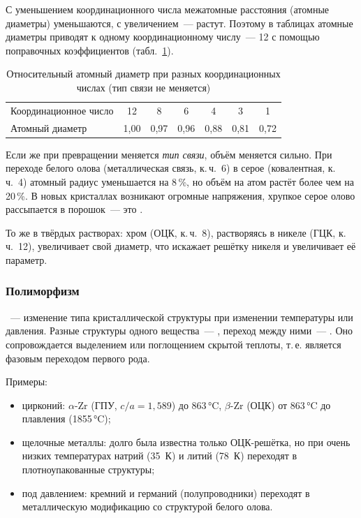 \begin{glavnoe}
С уменьшением координационного числа межатомные расстояния (атомные
диаметры) уменьшаются, с увеличением~— растут. Поэтому в таблицах
атомные диаметры приводят к одному координационному числу~— 12 с помощью
поправочных коэффициентов (табл.~\ref{tab:goldschmidt}).
\end{glavnoe}

\begin{table}[ht]
\centering
\caption{Относительный атомный диаметр при разных координационных числах
(тип связи не меняется)}
\label{tab:goldschmidt}
\small
\begin{tabular}{@{}lcccccc@{}}
\toprule
Координационное число & 12 & 8 & 6 & 4 & 3 & 1 \\
Атомный диаметр & 1,00 & 0,97 & 0,96 & 0,88 & 0,81 & 0,72 \\
\bottomrule
\end{tabular}
\end{table}

Если же при превращении меняется \emph{тип связи}, объём меняется сильно.
При переходе белого олова (металлическая связь, к.\,ч.~6) в серое
(ковалентная, к.\,ч.~4) атомный радиус уменьшается на 8\,\%, но объём на
атом растёт более чем на 20\,\%. В новых кристаллах возникают огромные
напряжения, хрупкое серое олово рассыпается в порошок~— это
.

То же в твёрдых растворах: хром (ОЦК, к.\,ч.~8), растворяясь в никеле (ГЦК,
к.\,ч.~12), увеличивает свой диаметр, что искажает решётку никеля и
увеличивает её параметр.

\subsubsection{Полиморфизм}

\begin{opredelenie}
~— изменение типа кристаллической структуры при
изменении температуры или давления. Разные структуры одного вещества~—
, переход между ними~— . Оно сопровождается выделением или поглощением скрытой
теплоты, т.\,е. является фазовым переходом первого рода.
\end{opredelenie}

Примеры:
\begin{itemize}
\item цирконий: $\alpha$-Zr (ГПУ, $c/a=1{,}589$) до 863\,°C, $\beta$-Zr (ОЦК)
от 863\,°C до плавления (1855\,°C);
\item щелочные металлы: долго была известна только ОЦК-решётка, но при
очень низких температурах натрий (35~К) и литий (78~К) переходят в
плотноупакованные структуры;
\item под давлением: кремний и германий (полупроводники) переходят в
металлическую модификацию со структурой белого олова.
\end{itemize}

